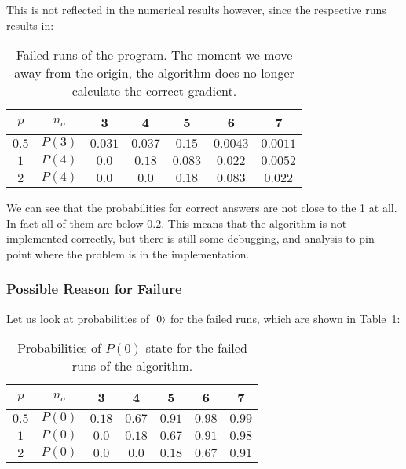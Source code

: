 \documentclass{article}
\begin{document}
This is not reflected in the numerical results however, since the respective runs results in:

\begin{table}[h]
    \centering
    \begin{tabular}{|c|c||c c c c c|}
        \hline
        $p$ & $n_o$ & 3 & 4 & 5 & 6 & 7 \\
        \hline
        $0.5$ & $P(3)$ & $0.031$ & $0.037$ & $0.15$ & $0.0043$ & $0.0011$ \\
        \hline
        $1$ & $P(4)$ & $0.0$ & $0.18$ & $0.083$ & $0.022$ & $0.0052$ \\
        \hline
        $2$ & $P(4)$ & $0.0$ & $0.0$ & $0.18$ & $0.083$ & $0.022$ \\
        \hline
    \end{tabular}
    \caption{
        Failed runs of the program.
        The moment we move away from the origin, the algorithm does no longer calculate
        the correct gradient.
    }
    \label{tab:failed-runs-1}
\end{table}

We can see that the probabilities for correct answers are not close to the 1 at all. In fact all of them are below $0.2$.
This means that the algorithm is not implemented correctly, but there is still some debugging,
and analysis to pin-point where the problem is in the implementation.

\subsubsection{Possible Reason for Failure}

Let us look at probabilities of $\ket{0}$ for the failed runs, which are shown in Table~\ref{tab:failed-runs-1}:

\begin{table}[h]
    \centering
    \begin{tabular}{|c|c||c c c c c|}
        \hline
        $p$ & $n_o$ & 3 & 4 & 5 & 6 & 7 \\
        \hline
        $0.5$ & $P(0)$ & $0.18$ & $0.67$ & $0.91$ & $0.98$ & $0.99$ \\
        \hline
        $1$ & $P(0)$ & $0.0$ & $0.18$ & $0.67$ & $0.91$ & $0.98$ \\
        \hline
        $2$ & $P(0)$ & $0.0$ & $0.0$ & $0.18$ & $0.67$ & $0.91$ \\
        \hline
    \end{tabular}
    \caption{
        Probabilities of $P(0)$ state for the failed runs of the algorithm.
    }
    \label{tab:failed-runs-2}
\end{table}
\end{document}
